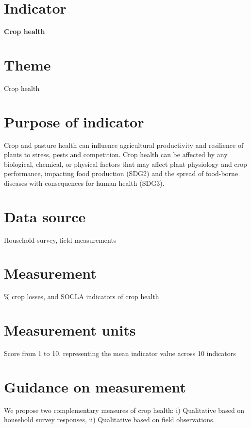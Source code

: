 \documentclass[
  letterpaper,
  DIV=11,
  numbers=noendperiod]{scrreprt}
\begin{document}
\section{Indicator}\label{indicator}

\textbf{Crop health}

\section{Theme}\label{theme}

Crop health

\section{Purpose of indicator}\label{purpose-of-indicator}

Crop and pasture health can influence agricultural productivity and
resilience of plants to stress, pests and competition. Crop health can
be affected by any biological, chemical, or physical factors that may
affect plant physiology and crop performance, impacting food production
(SDG2) and the spread of food-borne diseases with consequences for human
health (SDG3).

\section{Data source}\label{data-source}

Household survey, field measurements

\section{Measurement}\label{measurement}

\% crop losses, and SOCLA indicators of crop health

\section{Measurement units}\label{measurement-units}

Score from 1 to 10, representing the mean indicator value across 10
indicators

\section{Guidance on measurement}\label{guidance-on-measurement}

We propose two complementary measures of crop health: i) Qualitative
based on household survey responses, ii) Qualitative based on field
observations.
\end{document}
